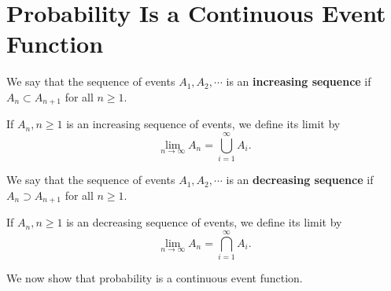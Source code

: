 \section{Probability Is a Continuous Event Function}

\begin{definition}
    We say that the sequence of events $A_1, A_2, \cdots$ is an \textbf{increasing sequence} if $A_n \subset A_{n+1}$ for all $n \ge 1$. 
\end{definition}

\begin{definition}
    If $A_n, n \ge 1$ is an increasing sequence of events, we define its limit by 
    \begin{equation*}
        \lim_{n \to \infty} A_n = \bigcup_{i=1}^\infty A_i.
    \end{equation*}
\end{definition}

\begin{definition}
    We say that the sequence of events $A_1, A_2, \cdots$ is an \textbf{decreasing sequence} if $A_n \supset A_{n+1}$ for all $n \ge 1$. 
\end{definition}

\begin{definition}
    If $A_n, n \ge 1$ is an decreasing sequence of events, we define its limit by 
    \begin{equation*}
        \lim_{n \to \infty} A_n = \bigcap_{i=1}^\infty A_i.
    \end{equation*}
\end{definition}

We now show that probability is a continuous event function.

